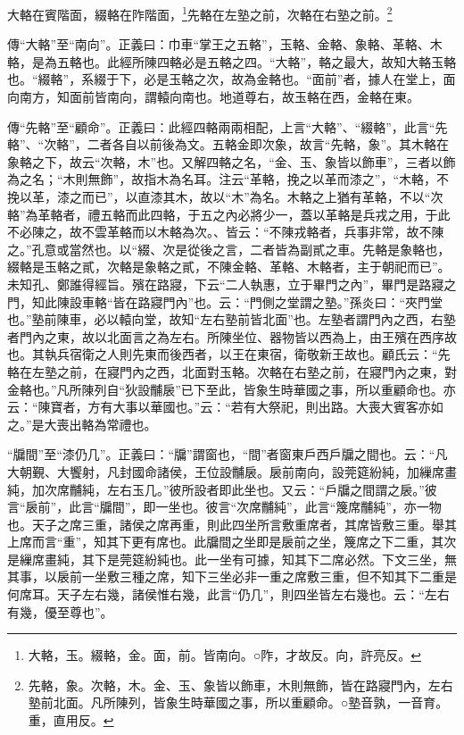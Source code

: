 大輅在賓階面，綴輅在阼階面，\footnote{大輅，玉。綴輅，金。面，前。皆南向。○阼，才故反。向，許亮反。}先輅在左塾之前，次輅在右塾之前。\footnote{先輅，象。次輅，木。金、玉、象皆以飾車，木則無飾，皆在路寢門內，左右塾前北面。凡所陳列，皆象生時華國之事，所以重顧命。○塾音孰，一音育。重，直用反。}

{\noindent\zhuan{}\fzbyks 傳“大輅”至“南向”。正義曰：巾車“掌王之五輅”，玉輅、金輅、象輅、革輅、木輅，是為五輅也。此經所陳四輅必是五輅之四。“大輅”，輅之最大，故知大輅玉輅也。“綴輅”，系綴于下，必是玉輅之次，故為金輅也。“面前”者，據人在堂上，面向南方，知面前皆南向，謂轅向南也。地道尊右，故玉輅在西，金輅在東。 \par}

{\noindent\zhuan{}\fzbyks 傳“先輅”至“顧命”。正義曰：此經四輅兩兩相配，上言“大輅”、“綴輅”，此言“先輅”、“次輅”，二者各自以前後為文。五輅金即次象，故言“先輅，象”。其木輅在象輅之下，故云“次輅，木”也。又解四輅之名，“金、玉、象皆以飾車”，三者以飾為之名；“木則無飾”，故指木為名耳。注云“革輅，挽之以革而漆之”，“木輅，不挽以革，漆之而已”，以直漆其木，故以“木”為名。木輅之上猶有革輅，不以“次輅”為革輅者，禮五輅而此四輅，于五之內必將少一，蓋以革輅是兵戎之用，于此不必陳之，故不雲革輅而以木輅為次。、皆云：“不陳戎輅者，兵事非常，故不陳之。”孔意或當然也。以“綴、次是從後之言，二者皆為副貳之車。先輅是象輅也，綴輅是玉輅之貳，次輅是象輅之貳，不陳金輅、革輅、木輅者，主于朝祀而已”。未知孔、鄭誰得經旨。殯在路寢，下云“二人執惠，立于畢門之內”，畢門是路寢之門，知此陳設車輅“皆在路寢門內”也。云：“門側之堂謂之塾。”孫炎曰：“夾門堂也。”塾前陳車，必以轅向堂，故知“左右塾前皆北面”也。左塾者謂門內之西，右塾者門內之東，故以北面言之為左右。所陳坐位、器物皆以西為上，由王殯在西序故也。其執兵宿衛之人則先東而後西者，以王在東宿，衛敬新王故也。顧氏云：“先輅在左塾之前，在寢門內之西，北面對玉輅。次輅在右塾之前，在寢門內之東，對金輅也。”凡所陳列自“狄設黼扆”已下至此，皆象生時華國之事，所以重顧命也。亦云：“陳寶者，方有大事以華國也。”云：“若有大祭祀，則出路。大喪大賓客亦如之。”是大喪出輅為常禮也。 \par}

{\noindent\shu{}\fzkt “牖間”至“漆仍几”。正義曰：“牖”謂窗也，“間”者窗東戶西戶牖之間也。云：“凡大朝覲、大饗射，凡封國命諸侯，王位設黼扆。扆前南向，設莞筵紛純，加繅席畫純，加次席黼純，左右玉几。”彼所設者即此坐也。又云：“戶牖之間謂之扆。”彼言“扆前”，此言“牖間”，即一坐也。彼言“次席黼純”，此言“篾席黼純”，亦一物也。天子之席三重，諸侯之席再重，則此四坐所言敷重席者，其席皆敷三重。舉其上席而言“重”，知其下更有席也。此牖間之坐即是扆前之坐，篾席之下二重，其次是繅席畫純，其下是莞筵紛純也。此一坐有可據，知其下二席必然。下文三坐，無其事，以扆前一坐敷三種之席，知下三坐必非一重之席敷三重，但不知其下二重是何席耳。天子左右幾，諸侯惟右幾，此言“仍几”，則四坐皆左右幾也。云：“左右有幾，優至尊也”。 \par}

